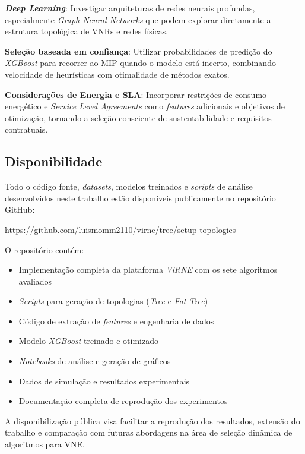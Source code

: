 \documentclass[conference]{IEEEtran}
\begin{document}
\textbf{\textit{Deep Learning}}: Investigar arquiteturas de redes neurais profundas, especialmente \textit{Graph Neural Networks} que podem explorar diretamente a estrutura topológica de VNRs e redes físicas.

\textbf{Seleção baseada em confiança}: Utilizar probabilidades de predição do \textit{XGBoost} para recorrer ao MIP quando o modelo está incerto, combinando velocidade de heurísticas com otimalidade de métodos exatos.

\textbf{Considerações de Energia e SLA}: Incorporar restrições de consumo energético e \textit{Service Level Agreements} como \textit{features} adicionais e objetivos de otimização, tornando a seleção consciente de sustentabilidade e requisitos contratuais.

\subsection{Disponibilidade}

Todo o código fonte, \textit{datasets}, modelos treinados e \textit{scripts} de análise desenvolvidos neste trabalho estão disponíveis publicamente no repositório GitHub:

\begin{center}
\url{https://github.com/luismomm2110/virne/tree/setup-topologies}
\end{center}

O repositório contém:
\begin{itemize}
    \item Implementação completa da plataforma \textit{ViRNE} com os sete algoritmos avaliados
    \item \textit{Scripts} para geração de topologias (\textit{Tree} e \textit{Fat-Tree})
    \item Código de extração de \textit{features} e engenharia de dados
    \item Modelo \textit{XGBoost} treinado e otimizado
    \item \textit{Notebooks} de análise e geração de gráficos
    \item Dados de simulação e resultados experimentais
    \item Documentação completa de reprodução dos experimentos
\end{itemize}

A disponibilização pública visa facilitar a reprodução dos resultados, extensão do trabalho e comparação com futuras abordagens na área de seleção dinâmica de algoritmos para VNE.





\end{document}
